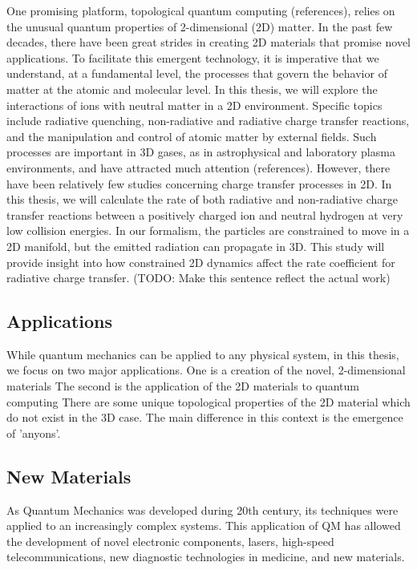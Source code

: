 One promising platform, topological quantum computing (references), relies on the unusual quantum properties of 2-dimensional (2D) matter. In the past few decades, there have been great strides in creating 2D materials that promise novel applications.\cite{Nature2D}
To facilitate this emergent technology, it is imperative that we understand, at a fundamental level, the processes that govern the behavior of matter at the atomic and molecular level. In this thesis, we will explore the interactions of ions with neutral matter in a 2D environment. Specific topics include radiative quenching, non-radiative and radiative charge transfer reactions, and the manipulation and control of atomic matter by external fields. Such processes are important in 3D gases,
as in astrophysical and laboratory plasma environments, and have attracted much attention
(references). However, there have been relatively few studies concerning charge transfer processes in 2D.
In this thesis, we will calculate the rate of both radiative 
and non-radiative charge transfer reactions between a positively charged ion and neutral hydrogen at very low collision energies. In our formalism, the particles are constrained to move in a 2D manifold, but the emitted radiation can propagate in 3D. This study will provide insight into how constrained 2D dynamics affect the rate coefficient for radiative charge transfer.
 (TODO: Make this sentence reflect the actual work)

\subsection{Applications}
 While quantum mechanics can be applied to any physical system, in this thesis, we focus on two major applications.
 One is a creation of the novel, 2-dimensional materials 
 The second is the application of the 2D materials to quantum computing 
 There are some unique topological properties of the 2D material which do not exist in the 3D case. The main difference in this context is the emergence of 'anyons'.
\subsection*{New Materials}

As Quantum Mechanics was developed during 20th century, its techniques were applied to an increasingly complex systems. This application of QM has allowed the development of novel electronic components, lasers, high-speed telecommunications, new diagnostic technologies in medicine, and new materials.

